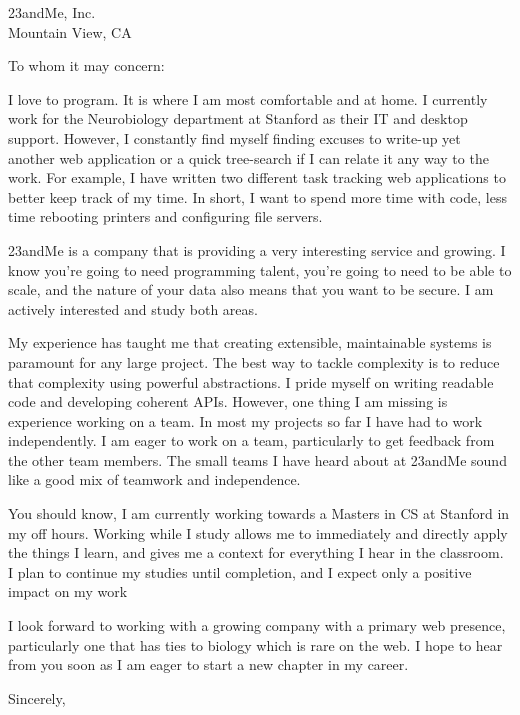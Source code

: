 \documentclass{letter}[11pt]
\begin{document}
\begin{letter}{23andMe, Inc.\\
Mountain View, CA
}

\opening{To whom it may concern:}

I love to program.  It is where I am most comfortable and at home.  I currently work for the Neurobiology department at Stanford as their IT and desktop support.  However, I constantly find myself finding excuses to write-up yet another web application or a quick tree-search if I can relate it any way to the work.  For example, I have written two different task tracking web applications to better keep track of my time.  In short, I want to spend more time with code, less time rebooting printers and configuring file servers.

23andMe is a company that is providing a very interesting service and growing.  I know you're going to need programming talent, you're going to need to be able to scale, and the nature of your data also means that you want to be secure.  I am actively interested and study both areas.  

My experience has taught me that creating extensible, maintainable systems is paramount for any large project.  The best way to tackle complexity is to reduce that complexity using powerful abstractions.  I pride myself on writing readable code and developing coherent APIs.  However, one thing I am missing is experience working on a team.  In most my projects so far I have had to work independently.  I am eager to work on a team, particularly to get feedback from the other team members.  The small teams I have heard about at 23andMe sound like a good mix of teamwork and independence.

You should know, I am currently working towards a Masters in CS at Stanford in my off hours.  Working while I study allows me to immediately and directly apply the things I learn, and gives me a context for everything I hear in the classroom.  I plan to continue my studies until completion, and I expect only a positive impact on my work

I look forward to working with a growing company with a primary web presence, particularly one that has ties to biology which is rare on the web.  I hope to hear from you soon as I am eager to start a new chapter in my career.

\closing{Sincerely,}
\end{letter}
\end{document}
